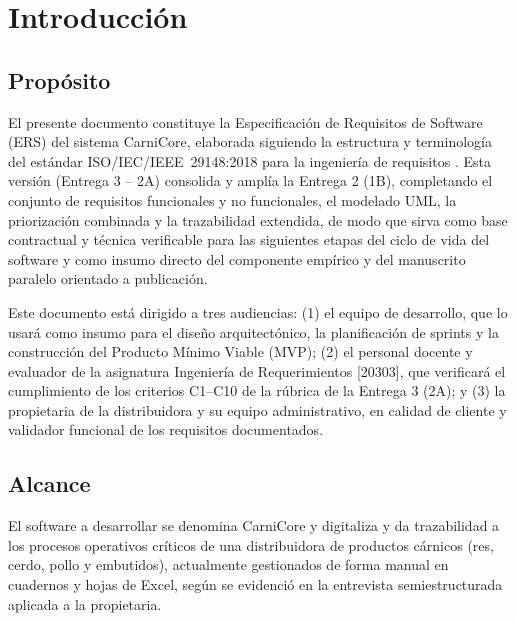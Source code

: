 \documentclass[11pt,a4paper]{article}
\begin{document}
\tableofcontents
\newpage

\section{Introducción}
\subsection{Propósito}
El presente documento constituye la Especificación de Requisitos de Software (ERS) del sistema CarniCore, elaborada siguiendo la estructura y terminología del estándar ISO/IEC/IEEE~29148:2018 para la ingeniería de requisitos \cite{iso29148}. Esta versión (Entrega 3 -- 2A) consolida y amplía la Entrega 2 (1B), completando el conjunto de requisitos funcionales y no funcionales, el modelado UML, la priorización combinada y la trazabilidad extendida, de modo que sirva como base contractual y técnica verificable para las siguientes etapas del ciclo de vida del software y como insumo directo del componente empírico y del manuscrito paralelo orientado a publicación.

Este documento está dirigido a tres audiencias: (1) el equipo de desarrollo, que lo usará como insumo para el diseño arquitectónico, la planificación de sprints y la construcción del Producto Mínimo Viable (MVP); (2) el personal docente y evaluador de la asignatura Ingeniería de Requerimientos [20303], que verificará el cumplimiento de los criterios C1--C10 de la rúbrica de la Entrega 3 (2A); y (3) la propietaria de la distribuidora y su equipo administrativo, en calidad de cliente y validador funcional de los requisitos documentados.

\subsection{Alcance}
El software a desarrollar se denomina CarniCore y digitaliza y da trazabilidad a los procesos operativos críticos de una distribuidora de productos cárnicos (res, cerdo, pollo y embutidos), actualmente gestionados de forma manual en cuadernos y hojas de Excel, según se evidenció en la entrevista semiestructurada aplicada a la propietaria.
\end{document}
